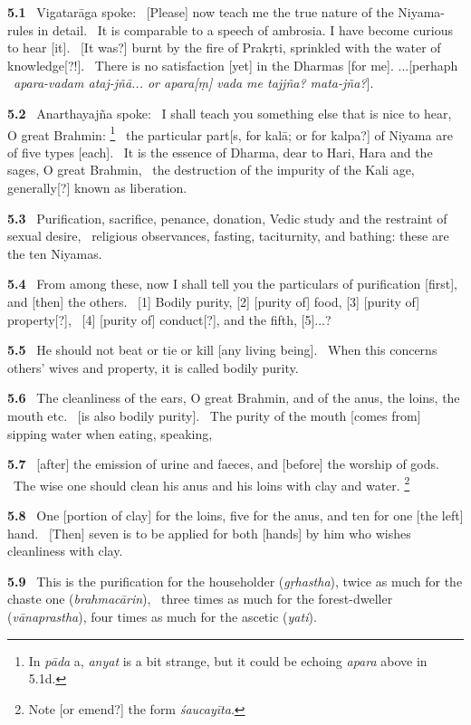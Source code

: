 \documentclass{article}
\newcommand{\skt}[1]{\textit{#1}}
\begin{document}
\textbf{5.1}%
\ Vigatarāga spoke:%
\ [Please] now teach me the true nature of the Niyama-rules in detail.%
\ It is comparable to a speech of ambrosia. I have become curious to hear [it].%
\ [It was?] burnt by the fire of Prakṛti, sprinkled with the water of knowledge[?!].%
\ There is no satisfaction [yet] in the Dharmas [for me]. ...[perhaph%
\                         \skt{apara-vadam ataj-jñā... or apara[ṃ] vada me tajjña? mata-jña?}].%


\textbf{5.2}%
\ Anarthayajña spoke:%
\ I shall teach you something else that is nice to hear, O great Brahmin:%
\footnote{In \skt{pāda} a, \skt{anyat} is a bit strange, but it could be echoing \skt{apara} above in 5.1d. }%
\ the particular part[s, for kalā; or for kalpa?] of Niyama are of five types [each].%
\ It is the essence of Dharma, dear to Hari, Hara and the sages, O great Brahmin,%
\ the destruction of the impurity of the Kali age, generally[?] known as liberation.%


\textbf{5.3}%
\ Purification, sacrifice, penance, donation, Vedic study and the restraint of sexual desire,%
\ religious observances, fasting, taciturnity, and bathing: these are the ten Niyamas.%


\textbf{5.4}%
\ From among these, now I shall tell you the particulars of purification [first], and [then] the others.%
\ [1] Bodily purity, [2] [purity of] food, [3] [purity of] property[?],%
\                  [4] [purity of] conduct[?], and the fifth, [5]...?%


\textbf{5.5}%
\ He should not beat or tie or kill [any living being].%
\ When this concerns others' wives and property, it is called bodily purity.%


\textbf{5.6}%
\ The cleanliness of the ears, O great Brahmin, and of the anus, the loins, the mouth etc.%
\                 [is also bodily purity].%
\ The purity of the mouth [comes from] sipping water when eating, speaking,%


\textbf{5.7}%
\ [after] the emission of urine and faeces, and [before] the worship of gods.%
\ The wise one should clean his anus and his loins with clay and water.%
\footnote{Note [or emend?] the form \skt{śaucayīta}.  }%


\textbf{5.8}%
\ One [portion of clay] for the loins, five for the anus, and ten for one [the left] hand.%
\ [Then] seven is to be applied for both [hands] by him who wishes cleanliness with clay.%


\textbf{5.9}%
\ This is the purification for the householder (\skt{gṛhastha}), twice as much for the chaste one (\skt{brahmacārin}),%
\                  three times as much for the forest-dweller (\skt{vānaprastha}), four times as much for the ascetic (\skt{yati}).%
\end{document}
